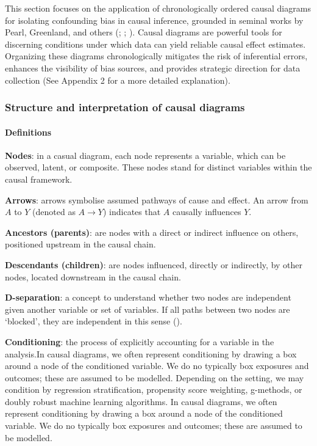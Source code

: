 \documentclass[
  singlecolumn,
  9pt]{article}
\let\oldparagraph\paragraph
\renewcommand{\paragraph}[1]{\oldparagraph{#1}\mbox{}}
\begin{document}
This section focuses on the application of chronologically ordered
causal diagrams for isolating confounding bias in causal inference,
grounded in seminal works by Pearl, Greenland, and others
(;
; ). Causal diagrams are powerful tools for discerning
conditions under which data can yield reliable causal effect estimates.
Organizing these diagrams chronologically mitigates the risk of
inferential errors, enhances the visibility of bias sources, and
provides strategic direction for data collection (See Appendix 2 for a
more detailed explanation).

\subsubsection{Structure and interpretation of causal
diagrams}\label{structure-and-interpretation-of-causal-diagrams}

\paragraph{Definitions}\label{definitions}

\textbf{Nodes}: in a casual diagram, each node represents a variable,
which can be observed, latent, or composite. These nodes stand for
distinct variables within the causal framework.

\textbf{Arrows}: arrows symbolise assumed pathways of cause and effect.
An arrow from \(A\) to \(Y\) (denoted as \(A \rightarrow Y\)) indicates
that \(A\) causally influences \(Y\).

\textbf{Ancestors (parents)}: are nodes with a direct or indirect
influence on others, positioned upstream in the causal chain.

\textbf{Descendants (children)}: are nodes influenced, directly or
indirectly, by other nodes, located downstream in the causal chain.

\textbf{D-separation}: a concept to understand whether two nodes are
independent given another variable or set of variables. If all paths
between two nodes are `blocked', they are independent in this sense
().

\textbf{Conditioning}: the process of explicitly accounting for a
variable in the analysis.In causal diagrams, we often represent
conditioning by drawing a box around a node of the conditioned variable.
We do no typically box exposures and outcomes; these are assumed to be
modelled. Depending on the setting, we may condition by regression
stratification, propensity score weighting, g-methods, or doubly robust
machine learning algorithms. In causal diagrams, we often represent
conditioning by drawing a box around a node of the conditioned variable.
We do no typically box exposures and outcomes; these are assumed to be
modelled.
\end{document}

